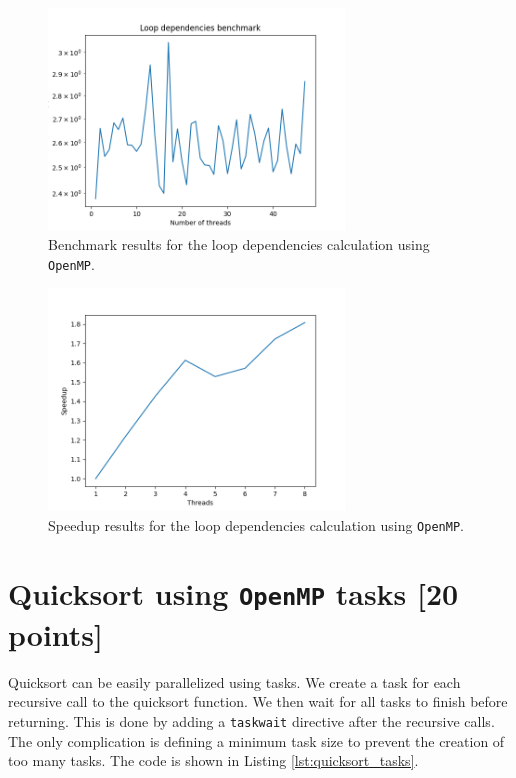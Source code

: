 \documentclass[unicode,11pt,a4paper,oneside,numbers=endperiod,openany]{scrartcl}
\begin{document}
\begin{figure}[h]
    \centering
    \includegraphics[width=0.7\textwidth]{../code/loop-dependencies/benchmark.png}
    \caption{Benchmark results for the loop dependencies calculation using \texttt{OpenMP}.}
    \label{fig:loop_dependencies_benchmark}
\end{figure}
\begin{figure}[h]
    \centering
    \includegraphics[width=0.7\textwidth]{../code/loop-dependencies/speedup.png}
    \caption{Speedup results for the loop dependencies calculation using \texttt{OpenMP}.}
    \label{fig:loop_dependencies_speedup}
\end{figure}

\section{Quicksort using \texttt{OpenMP} tasks [20 points]}

Quicksort can be easily parallelized using tasks. We create a task for each recursive call to the quicksort function. We then wait for all tasks to finish before returning. This is done by adding a \texttt{taskwait} directive after the recursive calls. The only complication is defining a minimum task size to prevent the creation of too many tasks. The code is shown in Listing \ref{lst:quicksort_tasks}.
\end{document}
